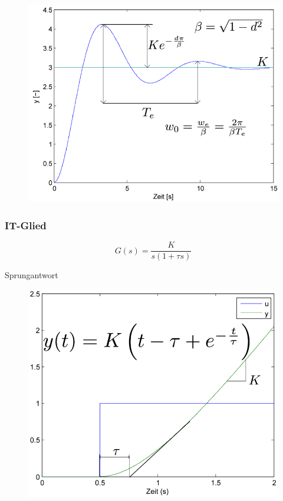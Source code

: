 \documentclass[
  10pt,
  a4paper,
  twocolumn]{article}
\numberwithin{equation}{section}
\begin{document}
\begin{figure}[H]

{\centering \includegraphics{images/paste-19.png}

}

\end{figure}

\hypertarget{it-glied}{%
\subsubsection{IT-Glied}\label{it-glied}}

\[
G(s)=\frac{K}{s(1+\tau s)}
\]

Sprungantwort

\begin{figure}[H]

{\centering \includegraphics{images/paste-21.png}

}

\end{figure}
\end{document}
